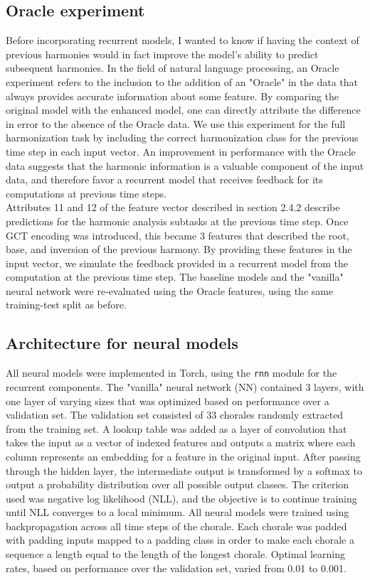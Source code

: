 \documentclass[11pt]{book}
\begin{document}
\subsection{Oracle experiment}

Before incorporating recurrent models, I wanted to know if having the context of previous harmonies would in fact improve the model's ability to predict subsequent harmonies. In the field of natural language processing, an Oracle experiment refers to the inclusion to the addition of an "Oracle" in the data that always provides accurate information about some feature. By comparing the original model with the enhanced model, one can directly attribute the difference in error to the absence of the Oracle data. We use this experiment for the full harmonization task by including the correct harmonization class for the previous time step in each input vector. An improvement in performance with the Oracle data suggests that the harmonic information is a valuable component of the input data, and therefore favor a recurrent model that receives feedback for its computations at previous time steps. \\

Attributes 11 and 12 of the feature vector described in section 2.4.2 describe predictions for the harmonic analysis subtasks at the previous time step. Once GCT encoding was introduced, this became 3 features that described the root, base, and inversion of the previous harmony. By providing these features in the input vector, we simulate the feedback provided in a recurrent model from the computation at the previous time step. The baseline models and the "vanilla" neural network were re-evaluated using the Oracle features, using the same training-test split as before.

\subsection{Architecture for neural models}

All neural models were implemented in Torch, using the \texttt{rnn} module for the recurrent components. The "vanilla" neural network (NN) contained 3 layers, with one layer of varying sizes that was optimized based on performance over a validation set. The validation set consisted of 33 chorales randomly extracted from the training set. A lookup table was added as a layer of convolution that takes the input as a vector of indexed features and outputs a matrix where each column represents an embedding for a feature in the original input. After passing through the hidden layer, the intermediate output is transformed by a softmax to output a probability distribution over all possible output classes. The criterion used was negative log likelihood (NLL), and the objective is to continue training until NLL converges to a local minimum. All neural models were trained using backpropagation across all time steps of the chorale. Each chorale was padded with padding inputs mapped to a padding class in order to make each chorale a sequence a length equal to the length of the longest chorale. Optimal learning rates, based on performance over the validation set, varied from 0.01 to 0.001. \\
\end{document}
